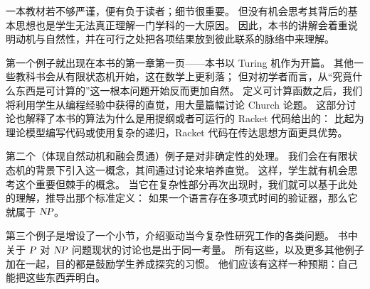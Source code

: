 一本教材若不够严谨，便有负于读者；细节很重要。
但没有机会思考其背后的基本思想也是学生无法真正理解一门学科的一大原因。
因此，本书的讲解会着重说明动机与自然性，并在可行之处把各项结果放到彼此联系的脉络中来理解。

第一个例子就出现在本书的第一章第一页——本书以 Turing 机作为开篇。
其他一些教科书会从有限状态机开始，这在数学上更利落；
但对初学者而言，从“究竟什么东西是可计算的”这一根本问题开始反而更加自然。
定义可计算函数之后，我们将利用学生从编程经验中获得的直觉，用大量篇幅讨论 Church 论题。
这部分讨论也解释了本书的算法为什么是用提纲或者可运行的 Racket 代码给出的：
比起为理论模型编写代码或使用复杂的递归，Racket 代码在传达思想方面更具优势。

第二个（体现自然动机和融会贯通）例子是对非确定性的处理。
我们会在有限状态机的背景下引入这一概念，其间通过讨论来培养直觉。
这样，学生就有机会思考这个重要但棘手的概念。
当它在复杂性部分再次出现时，我们就可以基于此处的理解，推导出那个标准定义：
如果一个语言存在多项式时间的验证器，那么它就属于 $\NP$。

第三个例子是增设了一个小节，介绍驱动当今复杂性研究工作的各类问题。
书中关于 $\P$ 对 $\NP$ 问题现状的讨论也是出于同一考量。
所有这些，以及更多其他例子加在一起，目的都是鼓励学生养成探究的习惯。
他们应该有这样一种预期：自己能把这些东西弄明白。



